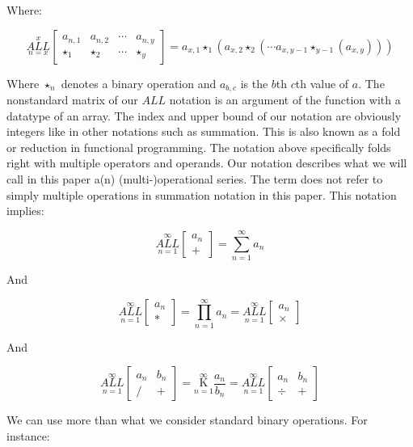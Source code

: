 \documentclass{article}
\begin{document}
Where:

$$\underset{n=x}{\overset{x}{ALL}} \begin{bmatrix}
a_{n,1} & a_{n,2} & \cdots & a_{n,y} \\
\star_1 & \star_2 & \cdots & \star_y
\end{bmatrix}=a_{x,1} \star_1 (a_{x,2} \star_2 (\cdots a_{x,y-1} \star_{y-1} (a_{x,y})))$$

Where $\star_n$ denotes a binary operation and $a_{b,c}$ is the $b$th $c$th value of $a$. The nonstandard matrix of our $ALL$ notation is an argument of the function with a datatype of an array. The index and upper bound of our notation are obviously integers like in other notations such as summation. This is also known as a fold or reduction in functional programming. The notation above specifically folds right with multiple operators and operands. Our notation describes what we will call in this paper a(n) (multi-)operational series. The term does not refer to simply multiple operations in summation notation in this paper. This notation implies:

$$\underset{n=1}{\overset{\infty}{ALL}} \begin{bmatrix}
a_n \\
+
\end{bmatrix}= \underset{n=1}{\overset{\infty}{\sum}} a_n$$

And

$$\underset{n=1}{\overset{\infty}{ALL}} \begin{bmatrix}
a_n \\
*
\end{bmatrix}= \underset{n=1}{\overset{\infty}{\prod}} a_n = \underset{n=1}{\overset{\infty}{ALL}} \begin{bmatrix}
a_n \\
\times
\end{bmatrix}$$

And

$$\underset{n=1}{\overset{\infty}{ALL}} \begin{bmatrix}
a_n & b_n \\
/ & +
\end{bmatrix}= \underset{n=1}{\overset{\infty}{\mathrm K}} \frac{a_n}{b_n}=\underset{n=1}{\overset{\infty}{ALL}} \begin{bmatrix}
a_n & b_n \\
\div & +
\end{bmatrix}$$

We can use more than what we consider standard binary operations. For instance:
\end{document}
